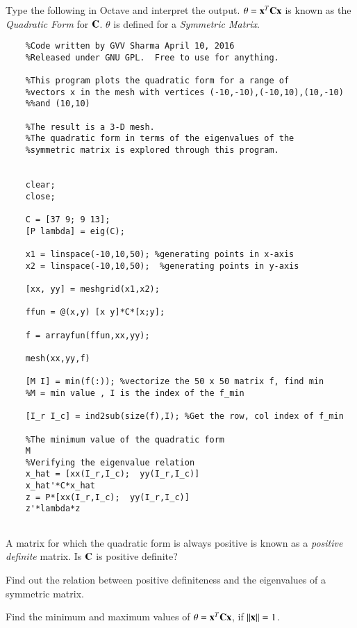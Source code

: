 \begin{problem}
	Type the following in Octave and interpret the output.  $\theta = \mathbf{x}^T\mathbf{C}\mathbf{x}$ is known as the {\em Quadratic Form} for $\mathbf{C}$. $\theta$ is defined for a {\em Symmetric Matrix}.
	\begin{verbatim}
	%Code written by GVV Sharma April 10, 2016
	%Released under GNU GPL.  Free to use for anything.
	
	%This program plots the quadratic form for a range of
	%vectors x in the mesh with vertices (-10,-10),(-10,10),(10,-10)
	%%and (10,10)
	
	%The result is a 3-D mesh.  
	%The quadratic form in terms of the eigenvalues of the
	%symmetric matrix is explored through this program.
	
	
	clear;
	close;
	
	C = [37 9; 9 13];
	[P lambda] = eig(C);
	
	x1 = linspace(-10,10,50); %generating points in x-axis
	x2 = linspace(-10,10,50);  %generating points in y-axis
	
	[xx, yy] = meshgrid(x1,x2);
	
	ffun = @(x,y) [x y]*C*[x;y];
	
	f = arrayfun(ffun,xx,yy);
	
	mesh(xx,yy,f)
	
	[M I] = min(f(:)); %vectorize the 50 x 50 matrix f, find min
	%M = min value , I is the index of the f_min
	
	[I_r I_c] = ind2sub(size(f),I); %Get the row, col index of f_min
	
	%The minimum value of the quadratic form
	M
	%Verifying the eigenvalue relation
	x_hat = [xx(I_r,I_c);  yy(I_r,I_c)]
	x_hat'*C*x_hat
	z = P*[xx(I_r,I_c);  yy(I_r,I_c)]
	z'*lambda*z
	
	\end{verbatim}
\end{problem}

\begin{problem}
	A matrix for which the quadratic form is always positive is known as a {\em positive definite} matrix.  Is $\mathbf{C}$ is positive definite?
\end{problem}
\begin{problem}
	Find out the relation between positive definiteness and the eigenvalues of a symmetric matrix.
\end{problem}

\begin{problem}
	Find the minimum and maximum values of $\theta =\mathbf{x}^T\mathbf{C}\mathbf{x}$, if $\lVert\mathbf{x}\rVert =1$.  
\end{problem}

